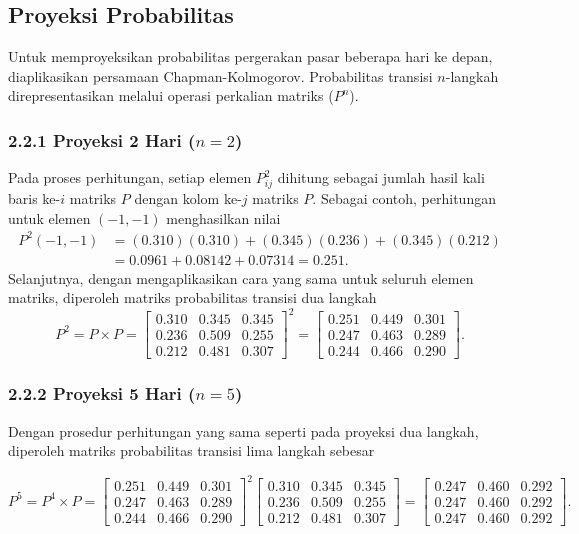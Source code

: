 \documentclass[12pt,a4paper]{article}
\numberwithin{equation}{section}
\begin{document}
\subsection{Proyeksi Probabilitas}
Untuk memproyeksikan probabilitas pergerakan pasar beberapa hari ke depan, diaplikasikan persamaan Chapman-Kolmogorov. Probabilitas transisi $n$-langkah direpresentasikan melalui operasi perkalian matriks ($P^n$).

\subsubsection*{2.2.1 Proyeksi 2 Hari ($n=2$)}
Pada proses perhitungan, setiap elemen $P^2_{ij}$ dihitung sebagai jumlah hasil kali baris ke-$i$ matriks $P$ dengan kolom ke-$j$ matriks $P$. Sebagai contoh, perhitungan untuk elemen $(-1,-1)$ menghasilkan nilai
\begin{align*}
P^2(-1,-1) &= (0.310)(0.310) + (0.345)(0.236) + (0.345)(0.212) \\
&= 0.0961 + 0.08142 + 0.07314 = 0.251.
\end{align*}
Selanjutnya, dengan mengaplikasikan cara yang sama untuk seluruh elemen matriks, diperoleh matriks probabilitas transisi dua langkah 
$$
P^2 = P \times P = 
\begin{bmatrix}
0.310 & 0.345 & 0.345 \\
0.236 & 0.509 & 0.255 \\
0.212 & 0.481 & 0.307
\end{bmatrix}^{2}
=
\begin{bmatrix}
0.251 & 0.449 & 0.301 \\
0.247 & 0.463 & 0.289 \\
0.244 & 0.466 & 0.290
\end{bmatrix}.
$$

\subsubsection*{2.2.2 Proyeksi 5 Hari ($n=5$)}
Dengan prosedur perhitungan yang sama seperti pada proyeksi dua langkah, diperoleh matriks probabilitas transisi lima langkah sebesar

$$
P^5 = P^4 \times P = 
\begin{bmatrix}
0.251 & 0.449 & 0.301 \\
0.247 & 0.463 & 0.289 \\
0.244 & 0.466 & 0.290
\end{bmatrix}^{2}
\begin{bmatrix}
0.310 & 0.345 & 0.345 \\
0.236 & 0.509 & 0.255 \\
0.212 & 0.481 & 0.307
\end{bmatrix}
=
\begin{bmatrix}
0.247 & 0.460 & 0.292 \\
0.247 & 0.460 & 0.292 \\
0.247 & 0.460 & 0.292
\end{bmatrix}.
$$
\end{document}

